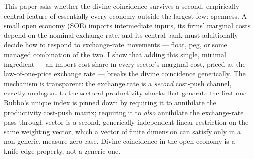 \documentclass[12pt]{article}
\begin{document}
This paper asks whether the divine coincidence survives a second, empirically central feature of
essentially every economy outside the largest few: openness. A small open economy (SOE) imports
intermediate inputs, its firms' marginal costs depend on the nominal exchange rate, and its central
bank must additionally decide how to respond to exchange-rate movements --- float, peg, or some
managed combination of the two. I show that adding this single, minimal ingredient --- an import
cost share in every sector's marginal cost, priced at the law-of-one-price exchange rate --- breaks
the divine coincidence generically. The mechanism is transparent: the exchange rate is a \emph{second}
cost-push channel, exactly analogous to the sectoral productivity shocks that generate the first one.
Rubbo's unique index is pinned down by requiring it to annihilate the productivity cost-push matrix;
requiring it to \emph{also} annihilate the exchange-rate pass-through vector is a second, generically
independent linear restriction on the same weighting vector, which a vector of finite dimension can
satisfy only in a non-generic, measure-zero case. Divine coincidence in the open economy is a
knife-edge property, not a generic one.
\end{document}
